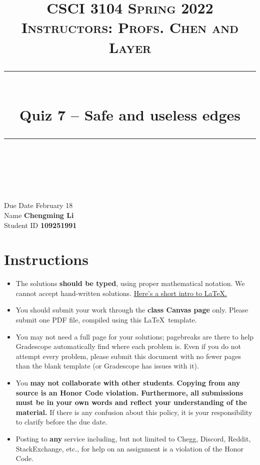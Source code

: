 \documentclass[11pt]{article}
\title{
\normalfont \normalsize 
\textsc{CSCI 3104 Spring 2022 \\ 
Instructors: Profs. Chen and Layer} \\
[10pt] 
\rule{\linewidth}{0.5pt} \\[6pt] 
\huge Quiz 7 -- Safe and useless edges \\
\rule{\linewidth}{2pt}  \\[10pt]
}
\date{}
\theoremstyle{definition}
\theoremstyle{definition}
\theoremstyle{definition}
\begin{document}

\maketitle


\noindent
Due Date \dotfill February 18 \\
Name \dotfill \textbf{Chengming Li} \\
Student ID \dotfill \textbf{109251991} \\


\tableofcontents

\section{Instructions}
 \begin{itemize}
	\item The solutions \textbf{should be typed}, using proper mathematical notation. We cannot accept hand-written solutions. \href{http://ece.uprm.edu/~caceros/latex/introduction.pdf}{Here's a short intro to \LaTeX.}
	\item You should submit your work through the \textbf{class Canvas page} only. Please submit one PDF file, compiled using this \LaTeX \ template.
	\item You may not need a full page for your solutions; pagebreaks are there to help Gradescope automatically find where each problem is. Even if you do not attempt every problem, please submit this document with no fewer pages than the blank template (or Gradescope has issues with it).

	\item You \textbf{may not collaborate with other students}. \textbf{Copying from any source is an Honor Code violation. Furthermore, all submissions must be in your own words and reflect your understanding of the material.} If there is any confusion about this policy, it is your responsibility to clarify before the due date. 

	\item Posting to \textbf{any} service including, but not limited to Chegg, Discord, Reddit, StackExchange, etc., for help on an assignment is a violation of the Honor Code.

\end{itemize}
\end{document}
